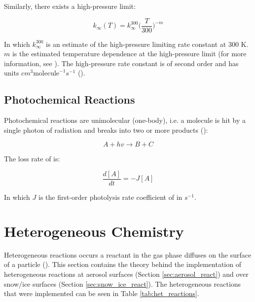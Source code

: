 \medskip

Similarly, there exists a high-pressure limit:

\begin{equation}
    k_\infty(T) = k_\infty^{300}\Big(\frac{T}{300}\Big)^{-m}
    \label{eq:3b_high_pressure}
\end{equation}

In which $k_\infty^{300}$ is an estimate of the high-pressure limiting rate constant at 300 K. $m$ is the estimated temperature dependence at the high-pressure limit (for more information, see \cite{JPL}). The high-pressure rate constant is of second order and has units $cm^3\text{molecule}^{-1}s^{-1}$ (\cite{AtmModFund}).


\subsection{Photochemical Reactions}\label{sec:pchem_reactions}

Photochemical reactions are unimolecular (one-body), i.e. a molecule is hit by a single photon of radiation and breaks into two or more products (\cite{AtmModFund}):

\begin{equation*}
    A + hv \rightarrow B + C
\end{equation*}

The loss rate of  is: 

\begin{equation*}
    \frac{d[A]}{dt} = -J[A]
\end{equation*}

In which $J$ is the first-order photolysis rate coefficient of  in $s^{-1}$. 


\section{Heterogeneous Chemistry}\label{sec:het_chem}

Heterogeneous reactions occurs a reactant in the gas phase diffuses on the surface of a particle (\cite{DAVIES2018}). This section contains the theory behind the implementation of heterogeneous reactions at aerosol surfaces (Section \ref{sec:aerosol_react}) and over snow/ice surfaces (Section \ref{sec:snow_ice_react}). The heterogeneous reactions that were implemented can be seen in Table \ref{tab:het_reactions}. 



